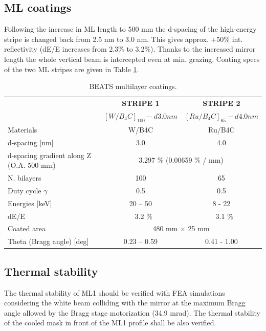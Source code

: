 \subsection{ML coatings}
Following the increase in ML length to 500 mm the d-spacing of the high-energy stripe is changed back from 2.5 nm to 3.0 nm. This gives approx. +50\% int. reflectivity (dE/E increases from 2.3\% to 3.2\%). Thanks to the increased mirror length the whole vertical beam is intercepted even at min. grazing. Coating specs of the two ML stripes are given in Table \ref{tab:coatings}.
\begin{center}
\begin{table}[h]
\begin{tabular}[bhp]{| l | c | c |}
\hline
 & \textbf{STRIPE 1} & \textbf{STRIPE 2} \\
 & \textbf{$[W/B_{4}C]_{100} - d 3.0 nm $} & \textbf{$[Ru/B_{4}C]_{65} - d 4.0 nm $} \\
\hline
Materials & W/B4C & Ru/B4C \\
d-spacing [nm] & 3.0 & 4.0 \\
d-spacing gradient along Z (O.A. 500 mm) & \multicolumn{2}{c|}{3.297 \% (0.00659 \% / mm)} \\ 
N. bilayers & 100 & 65 \\
Duty cycle $\gamma$ & 0.5 & 0.5 \\
Energies [keV] & 20 – 50 & 8 - 22 \\
dE/E & ~ 3.2 \% & ~ 3.1 \% \\
Coated area & \multicolumn{2}{c|}{480 mm × 25 mm} \\
Theta (Bragg angle) [deg] & 0.23 – 0.59 & 0.41 - 1.00 \\
\hline
\end{tabular}
\caption{\label{tab:coatings} BEATS multilayer coatings.}
\end{table}
\end{center}

\clearpage


% 

\clearpage
\subsection{Thermal stability}
The thermal stability of ML1 should be verified with FEA simulations considering the white beam colliding with the mirror at the maximum Bragg angle allowed by the Bragg stage motorization (34.9 mrad). The thermal stability of the cooled mask in front of the ML1 profile shall be also verified.\\

